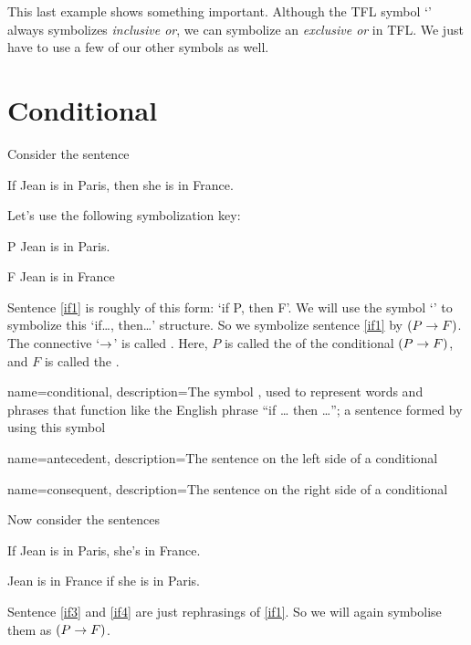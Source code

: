 This last example shows something important. Although the TFL symbol `\eor' always symbolizes \emph{inclusive or}, we can symbolize an \emph{exclusive or} in {TFL}. We just have to use a few of our other symbols as well.

\section{Conditional}
Consider the sentence
	\begin{earg}
		\item[\ex{if1}] If Jean is in Paris, then she is in France.
	\end{earg}
Let's use the following symbolization key:
	\begin{ekey}
		\item[P] Jean is in Paris.
		\item[F] Jean is in France
	\end{ekey}
Sentence \ref{if1} is roughly of this form: `if P, then F'. We will use the symbol `\eif' to symbolize this `if\ldots, then\ldots' structure. So we symbolize sentence \ref{if1} by $(P\rightarrow F)$. 	The connective `$\rightarrow$' is called . Here, $P$ is called the  of the conditional $(P \rightarrow F)$, and $F$ is called the .




{
name=conditional,
description={The symbol \eif, used to represent words and phrases that function like the English phrase ``if \dots{} then \dots''; a sentence formed by using this symbol}
}

{
name=antecedent,
description={The sentence on the left side of a \gls{conditional}}
}


{
name=consequent,
description={The sentence on the right side of a \gls{conditional}}
}

\noindent Now consider the sentences
\begin{earg}
		\item[\ex{if3}] If Jean is in Paris, she's in France.
		\item[\ex{if4}] Jean is in France if she is in Paris. 
\end{earg}


Sentence \ref{if3} and \ref{if4} are just rephrasings of \ref{if1}. So we will again symbolise them as $(P\rightarrow F)$.

